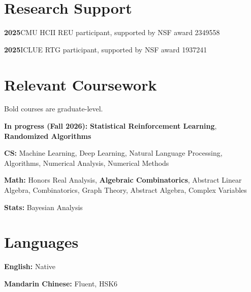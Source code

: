 \documentclass[letterpaper,11pt]{article}
\begin{document}
\section{Research Support}
\textbf{2025}\quad CMU HCII REU participant, supported by NSF award 2349558\par
\textbf{2025}\quad ICLUE RTG participant, supported by NSF award 1937241\par
\section{Relevant Coursework}
{\small Bold courses are graduate-level.}\par
\textbf{In progress (Fall 2026):} \textbf{Statistical Reinforcement Learning}, \textbf{Randomized Algorithms}\par
\textbf{CS:} Machine Learning, Deep Learning, Natural Language Processing, Algorithms, Numerical Analysis, Numerical Methods\par
\textbf{Math:} Honors Real Analysis, \textbf{Algebraic Combinatorics}, Abstract Linear Algebra, Combinatorics, Graph Theory, Abstract Algebra, Complex Variables\par
\textbf{Stats:} Bayesian Analysis\par
\section{Languages}
\textbf{English:} Native\par
\textbf{Mandarin Chinese:} Fluent, HSK6\par
\end{document}
